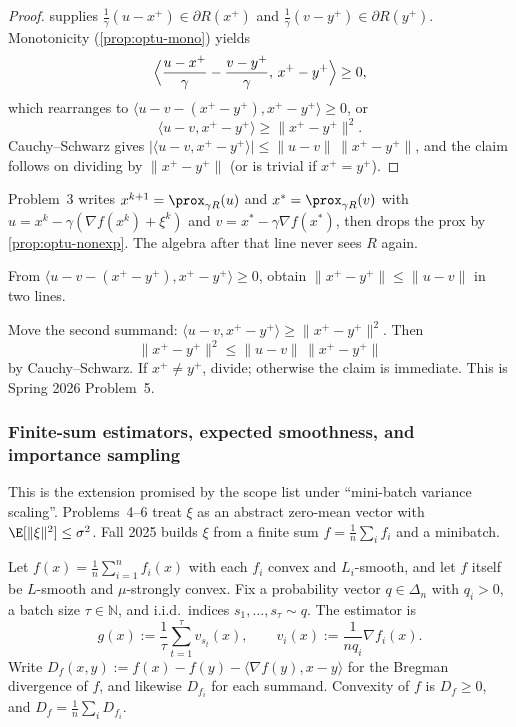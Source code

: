 \begin{proof}
 supplies $\frac1\gamma(u-x^+)\in\partial R(x^+)$ and $\frac1\gamma(v-y^+)\in\partial R(y^+)$. Monotonicity (\cref{prop:optu-mono}) yields
\[
\Bigl\langle \frac{u-x^+}{\gamma}-\frac{v-y^+}{\gamma},\, x^+-y^+\Bigr\rangle
\ge
0,
\]
which rearranges to $\langle u-v-(x^+-y^+),x^+-y^+\rangle\ge 0$, or
\[
\langle u-v,x^+-y^+\rangle
\ge
\|x^+-y^+\|^2.
\]
Cauchy--Schwarz gives $\lvert\langle u-v,x^+-y^+\rangle\rvert\le\|u-v\|\,\|x^+-y^+\|$, and the claim follows on dividing by $\|x^+-y^+\|$ (or is trivial if $x^+=y^+$).
\end{proof}

\begin{remark}
\label{rem:optu-p3-uses}
Problem~3 writes $x^{k+1}=\prox_{\gamma R}(u)$ and $x^*=\prox_{\gamma R}(v)$ with $u=x^k-\gamma(\nabla f(x^k)+\xi^k)$ and $v=x^*-\gamma\nabla f(x^*)$, then drops the prox by \cref{prop:optu-nonexp}. The algebra after that line never sees $R$ again.
\end{remark}

\begin{exercise}
\label{ex:optu-nonexp}
From $\langle u-v-(x^+-y^+),x^+-y^+\rangle\ge 0$, obtain $\|x^+-y^+\|\le\|u-v\|$ in two lines.
\end{exercise}

\begin{solution}
Move the second summand: $\langle u-v,x^+-y^+\rangle\ge\|x^+-y^+\|^2$. Then
\[
\|x^+-y^+\|^2
\le
\|u-v\|\,\|x^+-y^+\|
\]
by Cauchy--Schwarz. If $x^+\neq y^+$, divide; otherwise the claim is immediate. This is Spring 2026 Problem~5.
\end{solution}


\subsubsection{Finite-sum estimators, expected smoothness, and importance sampling}
\label{subsubsec:optu-finite-sum}

This is the extension promised by the scope list under ``mini-batch variance scaling''. Problems~4--6 treat $\xi$ as an abstract zero-mean vector with $\E[\|\xi\|^2]\le\sigma^2$. Fall 2025 builds $\xi$ from a finite sum $f=\frac1n\sum_i f_i$ and a minibatch.

\begin{notation}
\label{not:optu-g}
Let $f(x)=\frac1n\sum_{i=1}^n f_i(x)$ with each $f_i$ convex and $L_i$-smooth, and let $f$ itself be $L$-smooth and $\mu$-strongly convex. Fix a probability vector $q\in\Delta_n$ with $q_i>0$, a batch size $\tau\in\mathbb{N}$, and i.i.d.\ indices $s_1,\dots,s_\tau\sim q$. The estimator is
\[
g(x)
:=
\frac1\tau\sum_{t=1}^\tau v_{s_t}(x),
\qquad
v_i(x)
:=
\frac1{n q_i}\nabla f_i(x).
\]
Write $D_f(x,y):=f(x)-f(y)-\langle\nabla f(y),x-y\rangle$ for the Bregman divergence of $f$, and likewise $D_{f_i}$ for each summand. Convexity of $f$ is $D_f\ge 0$, and $D_f=\frac1n\sum_i D_{f_i}$.
\end{notation}

